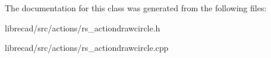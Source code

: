 The documentation for this class was generated from the following files\-:\begin{DoxyCompactItemize}
\item 
librecad/src/actions/rs\-\_\-actiondrawcircle.\-h\item 
librecad/src/actions/rs\-\_\-actiondrawcircle.\-cpp\end{DoxyCompactItemize}
